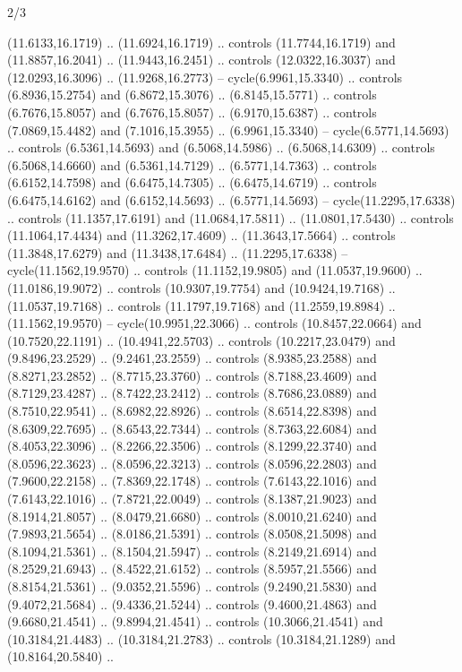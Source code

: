 \begin{flagdescription}{2/3}
\begin{scope}[yshift=\flagwidth,scale=\flagwidth/1241.93737]
\begin{scope}[y=-1mm, x=1mm,draw=gold,fill=blue,line join=miter,miter limit=4,line width=1.8\lw]
{  (11.6133,16.1719) .. (11.6924,16.1719) .. controls (11.7744,16.1719) and
  (11.8857,16.2041) .. (11.9443,16.2451) .. controls (12.0322,16.3037) and
  (12.0293,16.3096) .. (11.9268,16.2773) -- cycle(6.9961,15.3340) .. controls
  (6.8936,15.2754) and (6.8672,15.3076) .. (6.8145,15.5771) .. controls
  (6.7676,15.8057) and (6.7676,15.8057) .. (6.9170,15.6387) .. controls
  (7.0869,15.4482) and (7.1016,15.3955) .. (6.9961,15.3340) --
  cycle(6.5771,14.5693) .. controls (6.5361,14.5693) and (6.5068,14.5986) ..
  (6.5068,14.6309) .. controls (6.5068,14.6660) and (6.5361,14.7129) ..
  (6.5771,14.7363) .. controls (6.6152,14.7598) and (6.6475,14.7305) ..
  (6.6475,14.6719) .. controls (6.6475,14.6162) and (6.6152,14.5693) ..
  (6.5771,14.5693) -- cycle(11.2295,17.6338) .. controls (11.1357,17.6191) and
  (11.0684,17.5811) .. (11.0801,17.5430) .. controls (11.1064,17.4434) and
  (11.3262,17.4609) .. (11.3643,17.5664) .. controls (11.3848,17.6279) and
  (11.3438,17.6484) .. (11.2295,17.6338) -- cycle(11.1562,19.9570) .. controls
  (11.1152,19.9805) and (11.0537,19.9600) .. (11.0186,19.9072) .. controls
  (10.9307,19.7754) and (10.9424,19.7168) .. (11.0537,19.7168) .. controls
  (11.1797,19.7168) and (11.2559,19.8984) .. (11.1562,19.9570) --
  cycle(10.9951,22.3066) .. controls (10.8457,22.0664) and (10.7520,22.1191) ..
  (10.4941,22.5703) .. controls (10.2217,23.0479) and (9.8496,23.2529) ..
  (9.2461,23.2559) .. controls (8.9385,23.2588) and (8.8271,23.2852) ..
  (8.7715,23.3760) .. controls (8.7188,23.4609) and (8.7129,23.4287) ..
  (8.7422,23.2412) .. controls (8.7686,23.0889) and (8.7510,22.9541) ..
  (8.6982,22.8926) .. controls (8.6514,22.8398) and (8.6309,22.7695) ..
  (8.6543,22.7344) .. controls (8.7363,22.6084) and (8.4053,22.3096) ..
  (8.2266,22.3506) .. controls (8.1299,22.3740) and (8.0596,22.3623) ..
  (8.0596,22.3213) .. controls (8.0596,22.2803) and (7.9600,22.2158) ..
  (7.8369,22.1748) .. controls (7.6143,22.1016) and (7.6143,22.1016) ..
  (7.8721,22.0049) .. controls (8.1387,21.9023) and (8.1914,21.8057) ..
  (8.0479,21.6680) .. controls (8.0010,21.6240) and (7.9893,21.5654) ..
  (8.0186,21.5391) .. controls (8.0508,21.5098) and (8.1094,21.5361) ..
  (8.1504,21.5947) .. controls (8.2149,21.6914) and (8.2529,21.6943) ..
  (8.4522,21.6152) .. controls (8.5957,21.5566) and (8.8154,21.5361) ..
  (9.0352,21.5596) .. controls (9.2490,21.5830) and (9.4072,21.5684) ..
  (9.4336,21.5244) .. controls (9.4600,21.4863) and (9.6680,21.4541) ..
  (9.8994,21.4541) .. controls (10.3066,21.4541) and (10.3184,21.4483) ..
  (10.3184,21.2783) .. controls (10.3184,21.1289) and (10.8164,20.5840) ..
}
\end{scope}
\end{scope}
\end{flagdescription}
